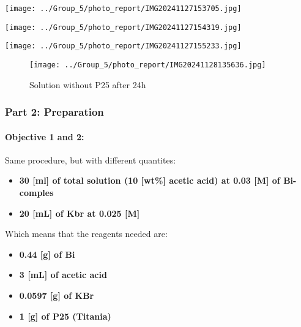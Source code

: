 \begin{minipage}{0.32\textwidth}
    \centering
	\texttt{[image: ../Group\_5/photo\_report/IMG20241127153705.jpg]}
\end{minipage}%
\begin{minipage}{0.32\textwidth}
    \centering
	\texttt{[image: ../Group\_5/photo\_report/IMG20241127154319.jpg]}
\end{minipage}%
\begin{minipage}{0.32\textwidth}
    \centering
	\texttt{[image: ../Group\_5/photo\_report/IMG20241127155233.jpg]}
\end{minipage}

\begin{figure}[ht]
    \centering
	\texttt{[image: ../Group\_5/photo\_report/IMG20241128135636.jpg]}
    \caption{Solution without P25 after 24h}
\end{figure}

\subsubsection{Part 2: Preparation}

\paragraph{Objective 1 and 2:}

Same procedure, but with different quantites:
\begin{itemize}
    \item \textbf{30 [ml] of total solution (10 [wt\%] acetic acid) at 0.03 [M] of Bi-comples}
    \item \textbf{20 [mL] of Kbr at 0.025 [M]}
\end{itemize}  

\noindent Which means that the reagents needed are:

\begin{itemize}
    \item \textbf{0.44 [g] of Bi}
    \item \textbf{3 [mL] of acetic acid}
    \item \textbf{0.0597 [g] of KBr}
    \item \textbf{1 [g] of P25 (Titania)}
\end{itemize}


